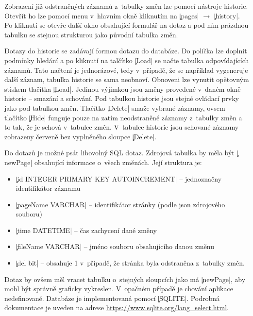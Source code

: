 Zobrazení již odstraněných záznamů z~tabulky změn lze pomocí nástroje historie.
Otevřít ho lze pomocí menu v~hlavním okně kliknutím na \c|pages| $\rightarrow$ \c|history|.
Po kliknutí se otevře další okno obsahující formulář na dotaz a pod ním prázdnou tabulku se stejnou strukturou jako původní tabulka změn.

Dotazy do historie se zadávají formou dotazu do databáze. 
Do políčka lze doplnit podmínky hledání a po kliknutí na talčítko \c|Load| se načte tabulka odpovídajících záznamů. 
Tato načtení je jednorázové, tedy v~případě, že se například vygeneruje další záznam, tabulka historie se sama neobnoví.
Obnoveni lze vynutit opětovným stiskem tlačítka \c|Load|.
Jedinou výjimkou jsou změny provedené v~daném okně historie -- smazání a schování.
Pod tabulkou historie jsou stejné ovládací prvky jako pod tabulkou změn.
Tlačítko \c|Delete| smaže vybrané záznamy, ovsem tlačítko \c|Hide| funguje pouze na zatím neodstraněné záznamy z~tabulky změn a to tak, že je schová  v~tabulce změn.
V~tabulce historie jsou schované záznamy zobrazeny červeně bez vyplněného sloupce \c|Delete|.

Do dotazů je možné psát libovolný SQL dotaz.
Zdrojová tabulka by měla být \c|newPage| obsahující informace o~všech změnách. Její struktura je:
\begin{itemize}
	\item \c|id INTEGER PRIMARY KEY AUTOINCREMENT| -- jednoznačny identifikátor záznamu
	\item \c|pageName VARCHAR| -- identifikátor stránky (podle json zdrojového souboru)
	\item \c|time DATETIME| -- čas zachycení dané změny
	\item \c|fileName VARCHAR| -- jméno souboru obsahujícího danou změnu
	\item \c|del bit| -- obsahuje 1 v~případě, že stránka byla odstraněna z~tabulky změn.
\end{itemize}
Dotaz by ovšem měl vracet tabulku o~stejných sloupcích jako má \c|newPage|, aby mohl být správně graficky vykreslen.
V~opačném případě je chování aplikace nedefinované.
Databáze je implementovaná pomocí \c|SQLITE|.
Podrobná dokumentace je uveden na adrese \url{https://www.sqlite.org/lang_select.html}.
